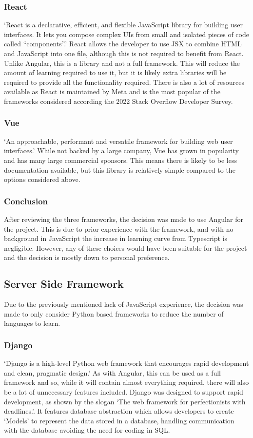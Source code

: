 \subsubsection*{React}
`React is a declarative, efficient, and flexible JavaScript library for building user interfaces. It lets you compose 
complex UIs from small and isolated pieces of code called “components”.'\cite{TutorialIntroReact} React allows the 
developer to use JSX to combine HTML and JavaScript into one file, although this is not required to benefit from React. 
Unlike Angular, this is a library and not a full framework. This will reduce the amount of learning required to use it,
but it is likely extra libraries will be required to provide all the functionality required. There is also a lot of 
resources available as React is maintained by Meta and is the most popular of the frameworks considered according the 
2022 Stack Overflow Developer Survey\cite{StackOverflowDeveloper}.
\subsubsection*{Vue}
`An approachable, performant and versatile framework for building web user interfaces.'\cite{VueJsProgressive} While not
 backed by a large company, Vue has grown in popularity and has many large commercial sponsors. This means there is 
likely to be less documentation available, but this library is relatively simple compared to the options considered 
above. 
\subsubsection*{Conclusion}
After reviewing the three frameworks, the decision was made to use Angular for the project. This is due to prior 
experience with the framework, and with no background in JavaScript the increase in learning curve from Typescript is 
negligible. However, any of these choices would have been suitable for the project and the decision is mostly down to 
personal preference.
\subsection{Server Side Framework}
Due to the previously mentioned lack of JavaScript experience, the decision was made to only consider Python based 
frameworks to reduce the number of languages to learn.
\subsubsection*{Django}
`Django is a high-level Python web framework that encourages rapid development and clean, pragmatic design.'\cite{Django}
As with Angular, this can be used as a full framework and so, while it will contain almost everything required, there 
will also be a lot of unnecessary features included. Django was designed to support rapid development, as shown by the 
slogan `The web framework for perfectionists with deadlines.'\cite{Django}. It features database abstraction which
 allows developers to create `Models' to represent the data stored in a database, handling communication with the 
database avoiding the need for coding in SQL.
